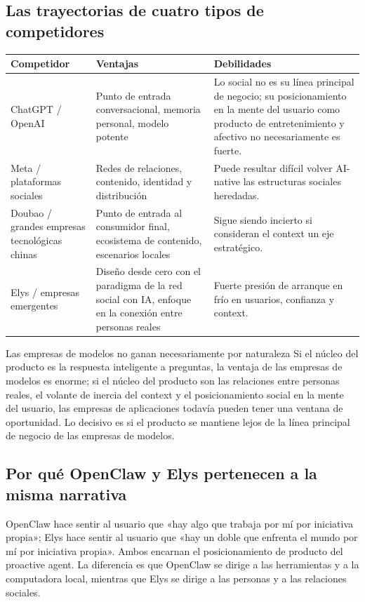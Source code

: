 \documentclass[a4paper]{article}
\begin{document}
\subsection{Las trayectorias de cuatro tipos de competidores}

\noindent\begin{longtable}{p{}p{}p{}}
\toprule
Competidor & Ventajas & Debilidades \\
\midrule
ChatGPT / OpenAI & Punto de entrada conversacional, memoria personal, modelo potente & Lo social no es su línea principal de negocio; su posicionamiento en la mente del usuario como producto de entretenimiento y afectivo no necesariamente es fuerte. \\
Meta / plataformas sociales & Redes de relaciones, contenido, identidad y distribución & Puede resultar difícil volver AI-native las estructuras sociales heredadas. \\
Doubao / grandes empresas tecnológicas chinas & Punto de entrada al consumidor final, ecosistema de contenido, escenarios locales & Sigue siendo incierto si consideran el context un eje estratégico. \\
Elys / empresas emergentes & Diseño desde cero con el paradigma de la red social con IA, enfoque en la conexión entre personas reales & Fuerte presión de arranque en frío en usuarios, confianza y context. \\
\bottomrule
\end{longtable}

\begin{warningbox}{Las empresas de modelos no ganan necesariamente por naturaleza}
Si el núcleo del producto es la respuesta inteligente a preguntas, la ventaja de las empresas de modelos es enorme; si el núcleo del producto son las relaciones entre personas reales, el volante de inercia del context y el posicionamiento social en la mente del usuario, las empresas de aplicaciones todavía pueden tener una ventana de oportunidad. Lo decisivo es si el producto se mantiene lejos de la línea principal de negocio de las empresas de modelos.
\end{warningbox}

\subsection{Por qué OpenClaw y Elys pertenecen a la misma narrativa}

OpenClaw hace sentir al usuario que «hay algo que trabaja por mí por iniciativa propia»; Elys hace sentir al usuario que «hay un doble que enfrenta el mundo por mí por iniciativa propia». Ambos encarnan el posicionamiento de producto del proactive agent. La diferencia es que OpenClaw se dirige a las herramientas y a la computadora local, mientras que Elys se dirige a las personas y a las relaciones sociales.
\end{document}
